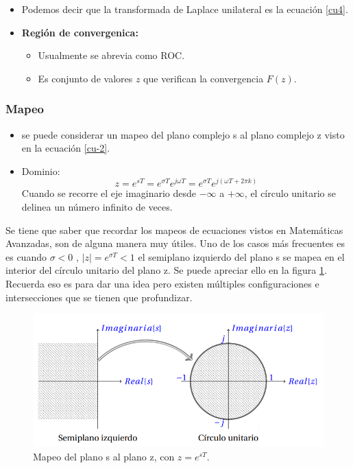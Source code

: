 \begin{itemize}
	\item Podemos decir que la transformada de Laplace unilateral es la ecuación \ref{cu4}.
	\item \textbf{Región de convergenica:}
	\begin{itemize}
		\item Usualmente se abrevia como ROC.
		\item Es conjunto de valores $z$ que verifican la convergencia $F(z)$.
	\end{itemize}
\end{itemize}

\subsubsection{Mapeo}
\begin{itemize}
	\item se puede considerar un mapeo del plano complejo s al plano complejo z visto en la ecuación \ref{cu-2}.
	\item Dominio: 
	$$ z=e^{s T}=e^{\sigma T} e^{j \omega T}=e^{\sigma T} e^{j(\omega T+2 \pi k)}$$
	\subitem Cuando se recorre el eje imaginario desde $ - \infty$ a $ + \infty$, el círculo unitario se delinea un número infinito de veces.
\end{itemize}

Se tiene que saber que recordar los mapeos de ecuaciones vistos en Matemáticas Avanzadas, son de alguna manera muy útiles. Uno de los casos más frecuentes es es cuando $\sigma <0$ , $ |z|=e^{\sigma T}<1$ el semiplano izquierdo del plano s se mapea en el interior del círculo unitario
del plano z. Se puede apreciar ello en la figura \ref{fig:000004}. Recuerda eso es para dar una idea pero existen múltiples configuraciones e intersecciones que se tienen que profundizar.


\begin{figure}[H]
	\centering
	\includegraphics[scale=0.5]{img/000004}
	\caption{Mapeo del plano s al plano z, con $z=e^{sT}$.}
	\label{fig:000004}
\end{figure}

